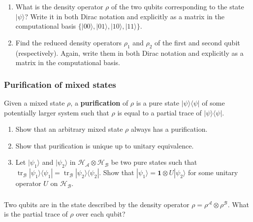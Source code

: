 \documentclass[fleqn]{article}
\begin{document}
\begin{enumerate}
\def\labelenumi{\arabic{enumi}.}
\item
  What is the density operator \(\rho\) of the two qubits corresponding to the state \(|\psi\rangle\)?
  Write it in both Dirac notation and explicitly as a matrix in the computational basis \(\{|00\rangle,|01\rangle,|10\rangle,|11\rangle\}\).
\item
  Find the reduced density operators \(\rho_1\) and \(\rho_2\) of the first and second qubit (respectively).
  Again, write them in both Dirac notation and explicitly as a matrix in the computational basis.
\end{enumerate}

\hypertarget{purification-of-mixed-states}{%
\subsubsection{Purification of mixed states}\label{purification-of-mixed-states}}

Given a mixed state \(\rho\), a \textbf{purification} of \(\rho\) is a pure state \(|\psi\rangle\langle\psi|\) of some potentially larger system such that \(\rho\) is equal to a partial trace of \(|\psi\rangle\langle\psi|\).

\begin{enumerate}
\def\labelenumi{\arabic{enumi}.}
\item
  Show that an arbitrary mixed state \(\rho\) always has a purification.
\item
  Show that purification is unique up to unitary equivalence.
\item
  Let \(|\psi_1\rangle\) and \(|\psi_2\rangle\) in \(\mathcal{H}_{\mathcal{A}}\otimes\mathcal{H}_{\mathcal{B}}\) be two pure states such that \(\operatorname{tr}_{\mathcal{B}}|\psi_1\rangle\langle\psi_1| = \operatorname{tr}_{\mathcal{B}}|\psi_2\rangle\langle\psi_2|\).
  Show that \(|\psi_1\rangle = \mathbf{1}\otimes U|\psi_2\rangle\) for some unitary operator \(U\) on \(\mathcal{H}_{\mathcal{B}}\).
\end{enumerate}

\hypertarget{section-31}{%
\subsubsection{}\label{section-31}}

Two qubits are in the state described by the density operator \(\rho = \rho^\mathcal{A}\otimes\rho^\mathcal{B}\).
What is the partial trace of \(\rho\) over each qubit?
\end{document}
